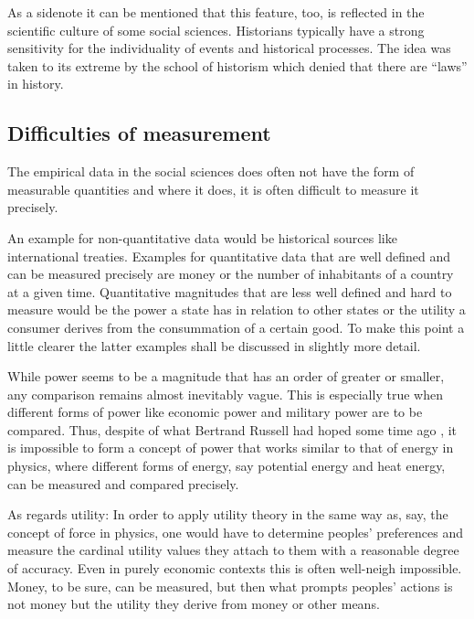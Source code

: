 \documentclass[onecollarge]{STJour}
\numberwithin{equation}{section}
\begin{document}
As a sidenote it can be mentioned that this feature, too, is reflected
in the scientific culture of some social sciences. Historians typically
have a strong sensitivity for the individuality of events and
historical processes. The idea was taken to its extreme
by the school of historism which denied that there are ``laws'' in
history.



\subsection{Difficulties of measurement}

The empirical data in the social sciences does often not have the form
of measurable quantities and where it does, it is often difficult
to measure it precisely. 

An example for non-quantitative data would be historical sources like
international treaties. Examples for quantitative data that are
well defined and can be measured precisely are money or the number
of inhabitants of a country at a given time. Quantitative magnitudes
that are less well defined and hard to measure would be the power a
state has in relation to other states or the utility a consumer derives
from the consummation of a certain good. To make this point a little
clearer the latter examples shall be discussed in slightly more
detail. 

While power seems to be a magnitude that has an order of greater or
smaller, any comparison remains almost inevitably vague. This is
especially true when different forms of power like economic power and
military power are to be compared. Thus, despite of what Bertrand Russell
had hoped some time ago \citep[p.\ 10]{russell:1938}, it is impossible to
form a concept of power that works similar to that of energy in physics,
where different forms of energy, say potential energy and heat energy,
can be measured and compared precisely.

As regards utility: In order to apply utility theory in the same way as,
say, the concept of force in physics, one would have to determine
peoples' preferences and measure the cardinal utility values they attach to them
with a reasonable degree of accuracy. Even in purely economic
contexts this is often well-neigh impossible. Money, to be sure, can be
measured, but then what prompts peoples' actions is not money but the
utility they derive from money or other means.
\end{document}

